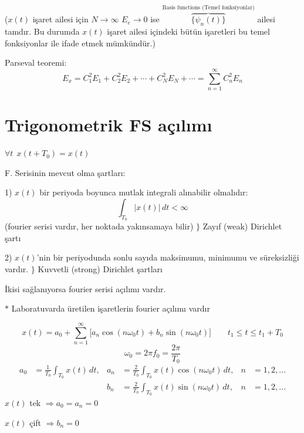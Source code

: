 \documentclass[11pt,a4paper]{article}
\begin{document}
($x(t)$ işaret ailesi için $N\to\infty$ $E_e\to 0$ ise $\overbrace{\{\psi_n(t)\}}^{\text{Basis functions (Temel fonksiyonlar)}}$ ailesi tamdır. Bu durumda $x(t)$ işaret ailesi içindeki bütün işaretleri bu temel fonksiyonlar ile ifade etmek mümkündür.)

Parseval teoremi:
\[ E_x=C_1^2E_1+C_2^2E_2+\cdots+C_N^2E_N+\cdots=\sum_{n=1}^{\infty}C_n^2E_n \]

\section{Trigonometrik FS açılımı}
$\forall t\ \ x(t+T_0)=x(t)$

F. Serisinin mevcut olma şartları:

1) $x(t)$ bir periyoda boyunca mutlak integrali alınabilir olmalıdır:
\[ \int_{T_0}|x(t)|\,dt<\infty \]
(fourier serisi vardır, her noktada yakınsamaya bilir) \hfill $\}$ Zayıf (weak) Dirichlet şartı

2) $x(t)$'nin bir periyodunda sonlu sayıda maksimumu, minimumu ve süreksizliği vardır. \hfill $\}$ Kuvvetli (strong) Dirichlet şartları

İkisi sağlanıyorsa fourier serisi açılımı vardır.

\textcolor{kirmizikalem}{$\ast$} Laboratuvarda üretilen işaretlerin fourier açılımı vardır

\[ x(t)=a_0+\sum_{n=1}^{\infty}\Big[a_n\cos(n\omega_0 t)+b_n\sin(n\omega_0 t)\Big] \qquad t_1\le t\le t_1+T_0 \]
\[ \omega_0=2\pi f_0=\frac{2\pi}{T_0} \]
\begin{align*}
a_0&=\frac{1}{T_0}\int_{T_0}x(t)\,dt, & a_n&=\frac{2}{T_0}\int_{T_0}x(t)\cos(n\omega_0 t)\,dt, & n&=1,2,\ldots \\
& & b_n&=\frac{2}{T_0}\int_{T_0}x(t)\sin(n\omega_0 t)\,dt, & n&=1,2,\ldots
\end{align*}
$x(t)$ tek $\Rightarrow a_0=a_n=0$

$x(t)$ çift $\Rightarrow b_n=0$

\end{document}
